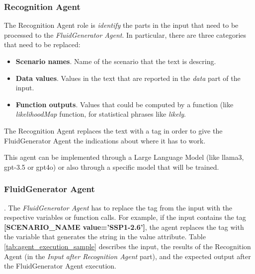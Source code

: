 \subsubsection{Recognition Agent}
The Recognition Agent role is \textit{identify} the parts in the input that need to be processed to the \textit{FluidGenerator Agent}. In particular, there are three categories that need to be replaced:
\begin{itemize}
    \item \textbf{Scenario names}. Name of the scenario that the text is descring.
    \item \textbf{Data values}. Values in the text that are reported in the \textit{data} part of the input.
    \item \textbf{Function outputs}. Values that could be computed by a function (like \textit{likelihoodMap} function, for statistical phrases like \textit{likely}.
\end{itemize}

The Recognition Agent replaces the text with a tag in order to give the FluidGenerator Agent the indications about where it has to work.

This agent can be implemented through a Large Language Model (like llama3, gpt-3.5 or gpt\-4o) or also through a specific model that will be trained.

\subsubsection{FluidGenerator Agent}.
The \textit{FluidGenerator Agent} has to replace the tag from the input with the respective variables or function calls. For example, if the input contains the tag \textbf{[SCENARIO\_NAME value='SSP1-2.6']}, the agent replaces the tag with the variable that generates the string in the value attribute. Table \ref{tab:agent_execution_sample} describes the input, the results of the Recognition Agent (in the \textit{Input after Recognition Agent} part), and the expected output after the FluidGenerator Agent execution.

